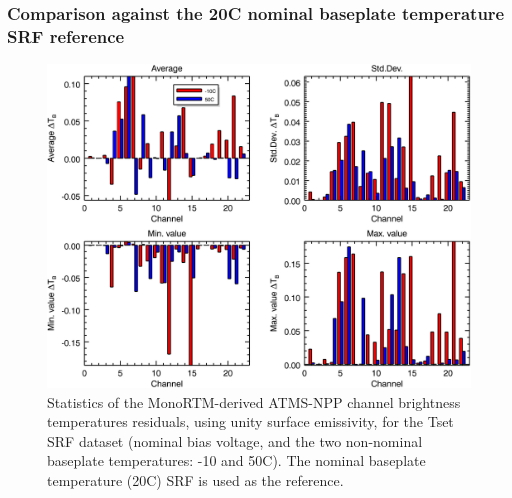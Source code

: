 \subsubsection{Comparison against the 20\textdegree{}C nominal baseplate temperature SRF reference}
\begin{figure}[H]
  \centering
    \includegraphics[bb=0 0 416 333,clip,scale=0.9]{graphics/dtb/Tset/e1.0_r0.0/stats_ref-nominal.png} 
  \caption{Statistics of the MonoRTM-derived ATMS-NPP channel brightness temperatures residuals, using unity surface emissivity, for the Tset SRF dataset (nominal bias voltage, and the two non-nominal baseplate temperatures: -10 and 50\textdegree{}C). The nominal baseplate temperature (20\textdegree{}C) SRF is used as the reference.}
  \label{fig:Tset_e1.0_r0.0_stats_ref-nominal}
\end{figure}

